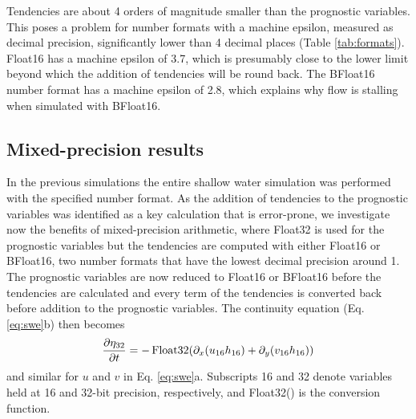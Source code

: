 Tendencies are about 4 orders of magnitude smaller than the prognostic variables. This poses a problem for number formats
with a machine epsilon, measured as decimal precision, significantly lower than 4 decimal places (Table \ref{tab:formats}).
Float16 has a machine epsilon of 3.7, which is presumably close to the lower limit beyond which the addition of tendencies
will be round back. The BFloat16 number format has a machine epsilon of 2.8, which explains why flow is stalling when
simulated with BFloat16.

\subsection{Mixed-precision results}
\label{sec:swm_results_mixed}

In the previous simulations the entire shallow water simulation was performed with the specified number format. As the addition
of tendencies to the prognostic variables was identified as a key calculation that is error-prone, we investigate now the benefits
of mixed-precision arithmetic, where Float32 is used for the prognostic variables but the tendencies are computed with either
Float16 or BFloat16, two number formats that have the lowest decimal precision around 1. The prognostic variables are now
reduced to Float16 or BFloat16 before the tendencies are calculated and every term of the tendencies is converted back before
addition to the prognostic variables. The continuity equation (Eq. \ref{eq:swe}b) then becomes
\begin{equation}
\frac{\partial \eta_{32}}{\partial t} = -\operatorname{Float32}( \partial_x(u_{16}h_{16})
+ \partial_y(v_{16}h_{16} ))
\label{eq:conversion}
\end{equation}
and similar for $u$ and $v$ in Eq. \ref{eq:swe}a. Subscripts 16 and 32 denote variables held at 16 and 32-bit precision, respectively,
and Float32() is the conversion function.

